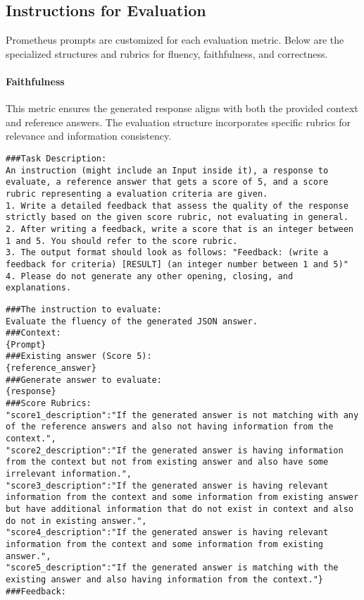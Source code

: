 \subsection{Instructions for Evaluation}

Prometheus prompts are customized for each evaluation metric. Below are the specialized structures and rubrics for fluency, faithfulness, and correctness.

\paragraph{Faithfulness}
This metric ensures the generated response aligns with both the provided context and reference answers. The evaluation structure incorporates specific rubrics for relevance and information consistency.


\begin{lstlisting}[style=textstyle, frame = single, caption=Task description used for evaluation of fluency and correctness, label=code:Task-description-fluency-correctness]
###Task Description:
An instruction (might include an Input inside it), a response to evaluate, a reference answer that gets a score of 5, and a score rubric representing a evaluation criteria are given.
1. Write a detailed feedback that assess the quality of the response strictly based on the given score rubric, not evaluating in general.
2. After writing a feedback, write a score that is an integer between 1 and 5. You should refer to the score rubric.
3. The output format should look as follows: "Feedback: (write a feedback for criteria) [RESULT] (an integer number between 1 and 5)"
4. Please do not generate any other opening, closing, and explanations.
\end{lstlisting}



\begin{lstlisting}[style=textstyle, frame = single, caption=Prompt structured correctness, label=code:estructured-faithfulness]
###The instruction to evaluate:
Evaluate the fluency of the generated JSON answer.
###Context:
{Prompt}
###Existing answer (Score 5):
{reference_answer}
###Generate answer to evaluate:
{response}
###Score Rubrics:
"score1_description":"If the generated answer is not matching with any of the reference answers and also not having information from the context.",
"score2_description":"If the generated answer is having information from the context but not from existing answer and also have some irrelevant information.",
"score3_description":"If the generated answer is having relevant information from the context and some information from existing answer but have additional information that do not exist in context and also do not in existing answer.",
"score4_description":"If the generated answer is having relevant information from the context and some information from existing answer.",
"score5_description":"If the generated answer is matching with the existing answer and also having information from the context."}
###Feedback:
\end{lstlisting}

